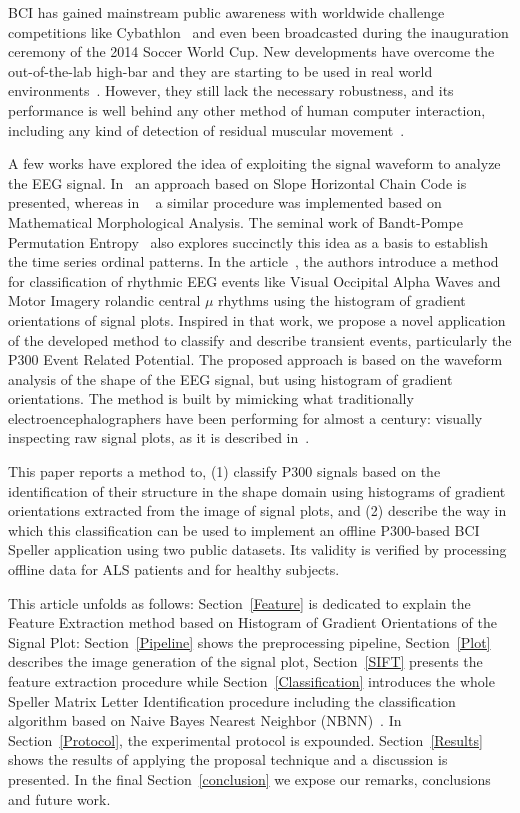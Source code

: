 \documentclass[entropy,article,submit,moreauthors,pdftex,10pt,a4paper]{mdpi}
\begin{document}
BCI has gained mainstream public awareness with worldwide challenge competitions like Cybathlon~\citep{Riener2014} and even been broadcasted during the inauguration ceremony of the 2014 Soccer World Cup.  New developments have overcome the out-of-the-lab high-bar and they are starting to be used in real world environments~\citep{Guger2017,Huggins2016}.  However, they still lack the necessary robustness, and its performance is well behind any other method of human computer interaction, including any kind of detection of residual muscular movement~\citep{Clerc}.

A few works have explored the idea of exploiting the signal waveform to analyze the EEG signal.  In~\citep{Alvarado-Gonzalez2016} an approach based on Slope Horizontal Chain Code is presented, whereas in ~\citep{Yamaguchi2009} a similar procedure was implemented based on Mathematical Morphological Analysis.  The seminal work of Bandt-Pompe Permutation Entropy~\citep{Berger2017} also explores succinctly this idea as a basis to establish the time series ordinal patterns.  In the article~\citep{Ramele2016},  the authors introduce a method for classification of rhythmic EEG events like Visual Occipital Alpha Waves  and Motor Imagery rolandic central $\mu$ rhythms using the histogram of gradient orientations of signal plots.  Inspired in that work, we propose a novel application of the developed method to classify and describe transient events, particularly the P300 Event Related Potential.  
The proposed approach is based on the waveform analysis of the shape of the EEG signal, but using histogram of gradient orientations. The method is built by mimicking what traditionally electroencephalographers have been performing for almost a century: visually inspecting raw signal plots, as it is described in~\citep{Hartman2005}.

This paper reports a method to, (1) classify P300 signals based on the identification of their structure in the shape domain using histograms of gradient orientations extracted from the image of signal plots, and (2) describe the way in which this classification can be used to implement an offline P300-based BCI Speller application using two public datasets. Its validity is verified by processing offline data for ALS patients and for healthy subjects. 

This article unfolds as follows: Section~\ref{Feature} is dedicated to explain the Feature Extraction method based on Histogram of Gradient Orientations of the Signal Plot: Section~\ref{Pipeline} shows the preprocessing pipeline,  Section~\ref{Plot}  describes the image generation of the signal plot, Section~\ref{SIFT}  presents the feature extraction procedure while  Section~\ref{Classification}  introduces the whole  Speller Matrix Letter Identification procedure including the classification algorithm based on Naive Bayes Nearest Neighbor (NBNN)~\citep{Boiman2008}. In Section~\ref{Protocol}, the experimental protocol is expounded. Section~\ref{Results} shows the results of applying the proposal technique and a discussion is presented. 
In the final Section~\ref{conclusion}  we expose our remarks, conclusions and future work.
\end{document}
